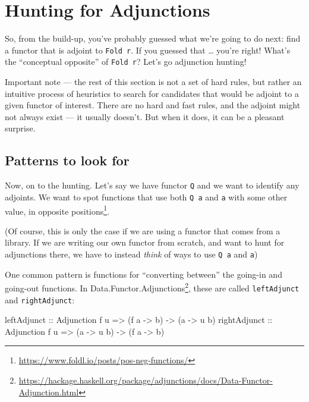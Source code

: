 \documentclass[]{article}
\newenvironment{Shaded}{}{}
\newcommand{\DataTypeTok}[1]{\textcolor[rgb]{0.56,0.13,0.00}{#1}}
\newcommand{\NormalTok}[1]{#1}
\newcommand{\OtherTok}[1]{\textcolor[rgb]{0.00,0.44,0.13}{#1}}
\renewcommand{\href}[2]{#2\footnote{\url{#1}}}
\begin{document}
\hypertarget{hunting-for-adjunctions}{%
\section{Hunting for Adjunctions}\label{hunting-for-adjunctions}}

So, from the build-up, you've probably guessed what we're going to do next: find
a functor that is adjoint to \texttt{Fold\ r}. If you guessed that \ldots{}
you're right! What's the ``conceptual opposite'' of \texttt{Fold\ r}? Let's go
adjunction hunting!

Important note --- the rest of this section is not a set of hard rules, but
rather an intuitive process of heuristics to search for candidates that would be
adjoint to a given functor of interest. There are no hard and fast rules, and
the adjoint might not always exist --- it usually doesn't. But when it does, it
can be a pleasant surprise.

\hypertarget{patterns-to-look-for}{%
\subsection{Patterns to look for}\label{patterns-to-look-for}}

Now, on to the hunting. Let's say we have functor \texttt{Q} and we want to
identify any adjoints. We want to spot functions that use both \texttt{Q\ a} and
\texttt{a} with some other value, in
\href{https://www.foldl.io/posts/pos-neg-functions/}{opposite positions}.

(Of course, this is only the case if we are using a functor that comes from a
library. If we are writing our own functor from scratch, and want to hunt for
adjunctions there, we have to instead \emph{think} of ways to use \texttt{Q\ a}
and \texttt{a})

One common pattern is functions for ``converting between'' the going-in and
going-out functions. In
\href{https://hackage.haskell.org/package/adjunctions/docs/Data-Functor-Adjunction.html}{Data.Functor.Adjunctions},
these are called \texttt{leftAdjunct} and \texttt{rightAdjunct}:

\begin{Shaded}
\begin{Highlighting}[]
\OtherTok{leftAdjunct  ::} \DataTypeTok{Adjunction}\NormalTok{ f u }\OtherTok{=>}\NormalTok{ (f a }\OtherTok{{-}>}\NormalTok{ b) }\OtherTok{{-}>}\NormalTok{ (a }\OtherTok{{-}>}\NormalTok{ u b)}
\OtherTok{rightAdjunct ::} \DataTypeTok{Adjunction}\NormalTok{ f u }\OtherTok{=>}\NormalTok{ (a }\OtherTok{{-}>}\NormalTok{ u b) }\OtherTok{{-}>}\NormalTok{ (f a }\OtherTok{{-}>}\NormalTok{ b)}
\end{Highlighting}
\end{Shaded}
\end{document}
